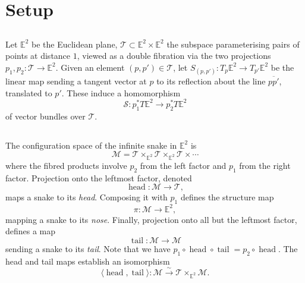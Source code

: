 \documentclass{amsart}
\def\EE{\mathbb{E}}
\def\sT{\mathscr{T}}
\def\sM{\mathscr{M}}
\def\sS{\mathscr{S}}
\DeclareMathOperator{\stail}{{\mathrm{tail}}}
\DeclareMathOperator{\shead}{{\mathrm{head}}}
\theoremstyle{definition}
\begin{document}
\section{Setup}

\subsection{}
Let $\EE^2$ be the Euclidean plane, $\sT \subset \EE^2 \times \EE^2$
the subspace parameterising pairs of points at distance $1$, viewed
as a double fibration via the two projections $p_1,p_2 : \sT \to \EE^2$.
Given an element
$(p,p') \in \sT$, let $S_{(p,p')} : T_p\EE^2 \to T_{p'}\EE^2$
be the linear map sending a tangent vector at $p$ to
its reflection about the line $\overline{pp'}$, translated
to $p'$. These induce a homomorphism 
$$ \sS : p_1^* T\EE^2 \to p_2^* T\EE^2  $$
of vector bundles over $\sT$.

\subsection{}
The configuration space of the infinite snake in $\EE^2$ is
$$ \sM = \sT \times_{\EE^2} \sT \times_{\EE^2} \sT \times \cdots $$
where the fibred products involve $p_2$ from the left factor and $p_1$ from the right factor.
Projection onto the leftmost factor, denoted $$ \shead : \sM \to \sT,$$ 
maps a snake to its \emph{head}.
Composing it with $p_1$ defines the structure map $$\pi : \sM \to \EE^2,$$ mapping
a snake to its \emph{nose}. Finally, projection onto all but the leftmost factor,
defines a map
$$ \stail:\sM \to \sM $$
sending a snake to its \emph{tail}.
Note that we have $p_1\circ\shead\circ\stail = p_2\circ\shead$.
The head and tail maps establish an isomorphism
\begin{equation}\label{eq:m-is-tm}
        \langle \shead,\stail\rangle : \sM \xrightarrow{\sim} \sT \times_{\EE^2} \sM.
\end{equation}
\end{document}
